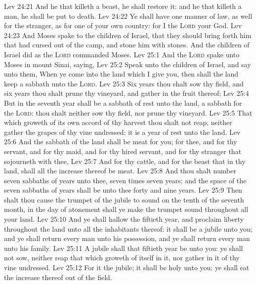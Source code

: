 \vs Lev 24:21 And he that killeth a beast, he shall restore it: and he that killeth a man, he shall be put to death.
\vs Lev 24:22 Ye shall have one manner of law, as well for the stranger, as for one of your own country: for I  the \textsc{Lord} your God.
\vs Lev 24:23 And Moses spake to the children of Israel, that they should bring forth him that had cursed out of the camp, and stone him with stones. And the children of Israel did as the \textsc{Lord} commanded Moses.
\vs Lev 25:1 And the \textsc{Lord} spake unto Moses in mount Sinai, saying,
\vs Lev 25:2 Speak unto the children of Israel, and say unto them, When ye come into the land which I give you, then shall the land keep a sabbath unto the \textsc{Lord}.
\vs Lev 25:3 Six years thou shalt sow thy field, and six years thou shalt prune thy vineyard, and gather in the fruit thereof;
\vs Lev 25:4 But in the seventh year shall be a sabbath of rest unto the land, a sabbath for the \textsc{Lord}: thou shalt neither sow thy field, nor prune thy vineyard.
\vs Lev 25:5 That which groweth of its own accord of thy harvest thou shalt not reap, neither gather the grapes of thy vine undressed:  it is a year of rest unto the land.
\vs Lev 25:6 And the sabbath of the land shall be meat for you; for thee, and for thy servant, and for thy maid, and for thy hired servant, and for thy stranger that sojourneth with thee,
\vs Lev 25:7 And for thy cattle, and for the beast that  in thy land, shall all the increase thereof be meat.
\vs Lev 25:8 And thou shalt number seven sabbaths of years unto thee, seven times seven years; and the space of the seven sabbaths of years shall be unto thee forty and nine years.
\vs Lev 25:9 Then shalt thou cause the trumpet of the jubile to sound on the tenth  of the seventh month, in the day of atonement shall ye make the trumpet sound throughout all your land.
\vs Lev 25:10 And ye shall hallow the fiftieth year, and proclaim liberty throughout  the land unto all the inhabitants thereof: it shall be a jubile unto you; and ye shall return every man unto his possession, and ye shall return every man unto his family.
\vs Lev 25:11 A jubile shall that fiftieth year be unto you: ye shall not sow, neither reap that which groweth of itself in it, nor gather  in it of thy vine undressed.
\vs Lev 25:12 For it  the jubile; it shall be holy unto you: ye shall eat the increase thereof out of the field.
